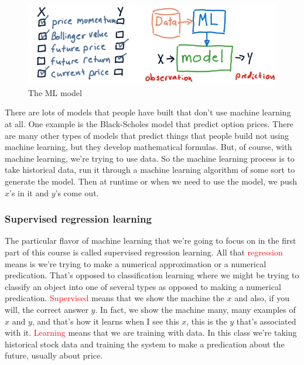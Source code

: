 \documentclass[12pt]{article}
\begin{document}
\begin{figure}[!ht]
\centering
\includegraphics[scale=0.45]{fig/fig71}
\caption{The ML model}
\end{figure}

There are lots of models that people have built that don't use machine learning at all. One example is the Black-Scholes model that predict option prices. There are many other types of models that predict things that people build not using machine learning, but they develop mathematical formulas. But, of course, with machine learning, we're trying to use data. So the machine learning process is to take historical data, run it through a machine learning algorithm of some sort to generate the model. Then at runtime or when we need to use the model, we push $x$'s in it and $y$'s come out. 

\subsubsection{Supervised regression learning}

The particular flavor of machine learning that we're going to focus on in the first part of this course is called supervised regression learning. All that \textcolor{red}{regression} means is we're trying to make a numerical approximation or a numerical predication. That's opposed to classification learning where we might be trying to classify an object into one of several types as opposed to making a numerical predication. \textcolor{red}{Supervised} means that we show the machine the $x$ and also, if you will, the correct answer $y$. In fact, we show the machine many, many examples of $x$ and $y$, and that's how it learns when I see this $x$, this is the $y$ that's associated with it. \textcolor{red}{Learning} means that we are training with data. In this class we're taking historical stock data and training the system to make a predication about the future, usually about price. 
\end{document}
